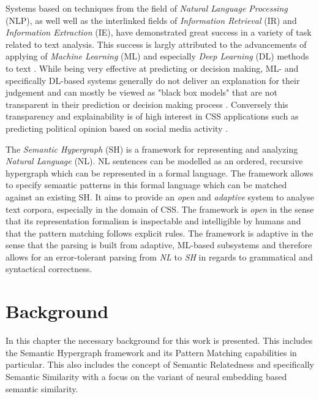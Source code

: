 \documentclass[11pt]{scrreprt}
\let\cite\parencite  %
\begin{document}
Systems based on techniques from the field of \textit{ Natural Language Processing} (NLP), as well well as the interlinked fields of \textit{Information Retrieval} (IR) and \textit{Information Extraction} (IE), have demonstrated great success in a variety of task related to text analysis. This success is largly attributed to the advancements of applying of \textit{Machine Learning} (ML) and especially \textit{Deep Learning} (DL) methods to text \cite{hirschbergAdvancesNaturalLanguage2015} \cite{qiuPretrainedModelsNatural2020}. While being very effective at predicting or decision making, ML- and specifically DL-based systems generally do not deliver an explanation for their judgement and can mostly be viewed as "black box models" that are not transparent in their prediction or decision making process \cite{rudinStopExplainingBlack2019}. Conversely this transparency and explainability is of high interest in CSS applications such as predicting political opinion based on social media activity \cite{wilkersonLargeScaleComputerizedText2017}.

The \textit{Semantic Hypergraph} (SH) \cite{menezesSemanticHypergraphs2021} is a framework for representing and analyzing \textit{Natural Language} (NL). NL sentences can be modelled as an ordered, recursive hypergraph which can be represented in a formal language. The framework allows to specify semantic patterns in this formal language which can be matched against an existing SH. It aims to provide an \textit{open} and \textit{adaptive} system to analyse text corpora, especially in the domain of CSS. The framework is \textit{open} in the sense that its representation formalism is inspectable and intelligible by humans and that the pattern matching follows explicit rules. The framework is adaptive in the sense that the parsing is built from adaptive, ML-based subsystems and therefore allows for an error-tolerant parsing from \textit{NL} to \textit{SH} in regards to grammatical and syntactical correctness.



\chapter{Background}
In this chapter the necessary background for this work is presented. This includes the Semantic Hypergraph framework and its Pattern Matching capabilities in particular. This also includes the concept of Semantic Relatedness and specifically Semantic Similarity with a focus on the variant of neural embedding based semantic similarity.
\end{document}
